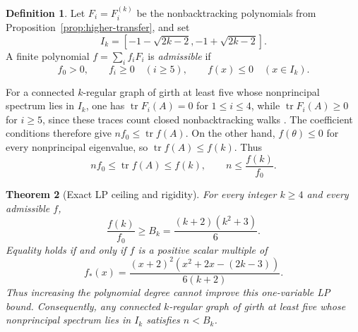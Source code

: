 \documentclass[a4paper,10pt,reqno]{amsart}
\theoremstyle{plain}
\newtheorem{theorem}{Theorem}[section]
\theoremstyle{definition}
\newtheorem{definition}[theorem]{Definition}
\theoremstyle{remark}
\newcommand{\tr}{\operatorname{tr}}
\newcommand{\resultbox}[1]{\boxed{#1}}
\begin{document}
\begin{definition}
Let \(F_i=F_i^{(k)}\) be the nonbacktracking polynomials from
Proposition~\ref{prop:higher-transfer}, and set
\[
 I_k=[-1-\sqrt{2k-2},-1+\sqrt{2k-2}].
\]
A finite polynomial \(f=\sum_i f_iF_i\) is \emph{admissible} if
\[
 f_0>0,
 \qquad f_i\ge0\quad(i\ge5),
 \qquad f(x)\le0\quad(x\in I_k).
\]
\end{definition}

For a connected \(k\)-regular graph of girth at least five whose nonprincipal spectrum
lies in \(I_k\), one has \(\tr F_i(A)=0\) for \(1\le i\le4\), while
\(\tr F_i(A)\ge0\) for \(i\ge5\), since these traces count closed
nonbacktracking walks \cite[Theorem~1 and Corollary~1]{Nozaki2015}.
The coefficient conditions therefore give
\(nf_0\le\tr f(A)\).  On the other hand, \(f(\theta)\le0\) for every
nonprincipal eigenvalue, so \(\tr f(A)\le f(k)\).  Thus
\[
 nf_0\le\tr f(A)\le f(k),
 \qquad n\le\frac{f(k)}{f_0}.
\]

\begin{theorem}[Exact LP ceiling and rigidity]\label{thm:lp-ceiling}
For every integer \(k\ge4\) and every admissible \(f\),
\[
 \resultbox{
 \frac{f(k)}{f_0}\ge B_k=\frac{(k+2)(k^2+3)}6.
 }
\]
Equality holds if and only if \(f\) is a positive scalar multiple of
\[
 \resultbox{
 f_*(x)=\frac{(x+2)^2(x^2+2x-(2k-3))}{6(k+2)}.
 }
\]
Thus increasing the polynomial degree cannot improve this one-variable LP
bound.  Consequently, any connected \(k\)-regular graph of girth at least
five whose nonprincipal spectrum lies in \(I_k\) satisfies \(n<B_k\).
\end{theorem}
\end{document}
